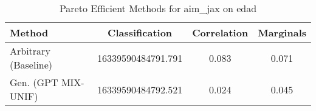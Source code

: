 \begin{table}[t!]
    \centering
    \caption{Pareto Efficient Methods for aim_jax on edad}
    \label{tab:pareto_efficient_methods_aim_jax_edad}
    \begin{tabular}{lccc}
    \toprule
    Method & Classification & Correlation & Marginals \\
    \midrule
    Arbitrary (Baseline) & \cellcolor{gold!30}16339590484791.791 & \cellcolor{silver!30}0.083 & \cellcolor{silver!30}0.071 \\
    Gen. (GPT MIX-UNIF) & \cellcolor{silver!30}16339590484792.521 & \cellcolor{gold!30}0.024 & \cellcolor{gold!30}0.045 \\
    \bottomrule
    \end{tabular}
\end{table}